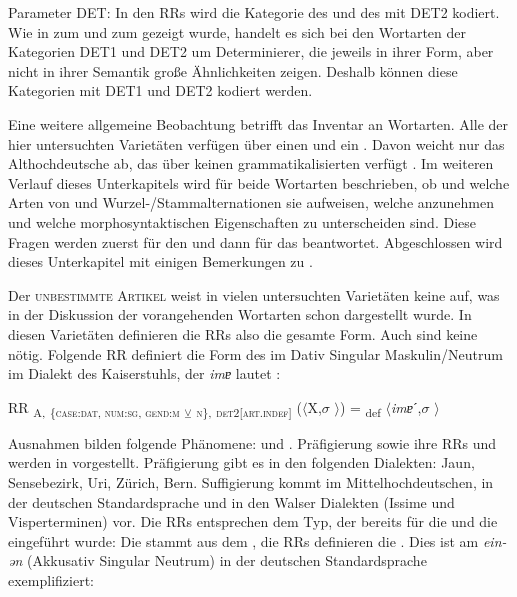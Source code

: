 {Parameter DET}: In den RRs wird die Kategorie des  und des  mit DET2 kodiert. Wie in  zum  und zum  gezeigt wurde, handelt es sich bei den Wortarten der Kategorien DET1 und DET2 um Determinierer, die jeweils in ihrer Form, aber nicht in ihrer Semantik große Ähnlichkeiten zeigen. Deshalb können diese Kategorien mit DET1 und DET2 kodiert werden.

Eine weitere allgemeine Beobachtung betrifft das Inventar an Wortarten. Alle der hier untersuchten Varietäten verfügen über einen  und ein . Davon weicht nur das Althochdeutsche ab, das über keinen grammatikalisierten  verfügt \citep[26]{Schrodt2004}. Im weiteren Verlauf dieses Unterkapitels wird für beide Wortarten beschrieben, ob und welche Arten von  und Wur\-zel-/Stamm\-al\-ter\-na\-tio\-nen sie aufweisen, welche  anzunehmen und welche morphosyntaktischen Eigenschaften zu unterscheiden sind. Diese Fragen werden zuerst für den  und dann für das  beantwortet. Abgeschlossen wird dieses Unterkapitel mit einigen Bemerkungen zu .

Der \textsc{unbestimmte Artikel} weist in vielen untersuchten Varietäten keine  auf, was in der Diskussion der vorangehenden Wortarten schon  dargestellt wurde. In diesen Varietäten definieren die RRs also die gesamte Form. Auch sind keine  nötig. Folgende RR definiert die Form des  im Dativ Singular Maskulin/Neutrum im Dialekt des Kaiserstuhls, der \textit{imɐ} lautet \citep[376]{Noth1993}:

\ea%
\label{ex:key:140}
 RR \textsubscript{A,} \textsubscript{\{\textsc{case:dat}}\textsubscript{, \textsc{num:sg}, \textsc{gend:m}} \textsubscript{\tiny $\veebar$} \textsubscript{\scshape n}\textsubscript{\},} \textsubscript{\textsc{det2[art.indef]}} ($\langle$X,$\sigma$ $\rangle$) = \textsubscript{def} $\langle$\textit{imɐ}ˊ,$\sigma$ $\rangle$ \\
\z

Ausnahmen bilden folgende Phänomene:  und . Präfigierung sowie ihre RRs und  werden in  vorgestellt. Präfigierung gibt es in den folgenden Dialekten: Jaun, Sensebezirk, Uri, Zürich, Bern. Suffigierung kommt im Mittelhochdeutschen, in der deutschen Standardsprache und in den Walser Dialekten (Issime und Visperterminen) vor. Die RRs entsprechen dem Typ, der bereits für die  und die  eingeführt wurde: Die \linebreak stammt aus dem , die RRs definieren die . Dies ist am  \textit{ein-ən} (Akkusativ Singular Neutrum) in der deutschen Standardsprache exemplifiziert:

